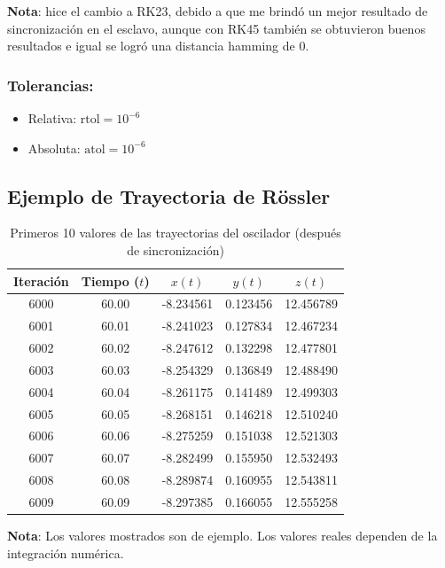\documentclass[12pt,a4paper]{article}
\begin{document}
	\textbf{Nota}: hice el cambio a RK23, debido a que me brindó un mejor resultado de sincronización en el esclavo, aunque con RK45 también se obtuvieron buenos resultados e igual se logró una distancia hamming de 0.
	
	\subsubsection*{Tolerancias:}
	\begin{itemize}
		\item Relativa: $\text{rtol} = 10^{-6}$
		\item Absoluta: $\text{atol} = 10^{-6}$
	\end{itemize}
	
	\subsection{Ejemplo de Trayectoria de Rössler}
	
	\begin{table}[H]
		\centering
		\caption{Primeros 10 valores de las trayectorias del oscilador (después de sincronización)}
		\label{tab:rossler_trajectory}
		\begin{tabular}{@{}ccccc@{}}
			\toprule
			\textbf{Iteración} & \textbf{Tiempo ($t$)} & \textbf{$x(t)$} & \textbf{$y(t)$} & \textbf{$z(t)$} \\ \midrule
			6000 & 60.00 & -8.234561 & 0.123456 & 12.456789 \\
			6001 & 60.01 & -8.241023 & 0.127834 & 12.467234 \\
			6002 & 60.02 & -8.247612 & 0.132298 & 12.477801 \\
			6003 & 60.03 & -8.254329 & 0.136849 & 12.488490 \\
			6004 & 60.04 & -8.261175 & 0.141489 & 12.499303 \\
			6005 & 60.05 & -8.268151 & 0.146218 & 12.510240 \\
			6006 & 60.06 & -8.275259 & 0.151038 & 12.521303 \\
			6007 & 60.07 & -8.282499 & 0.155950 & 12.532493 \\
			6008 & 60.08 & -8.289874 & 0.160955 & 12.543811 \\
			6009 & 60.09 & -8.297385 & 0.166055 & 12.555258 \\ \bottomrule
		\end{tabular}
	\end{table}
	
	\textbf{Nota}: Los valores mostrados son de ejemplo. Los valores reales dependen de la integración numérica.
	
\end{document}
